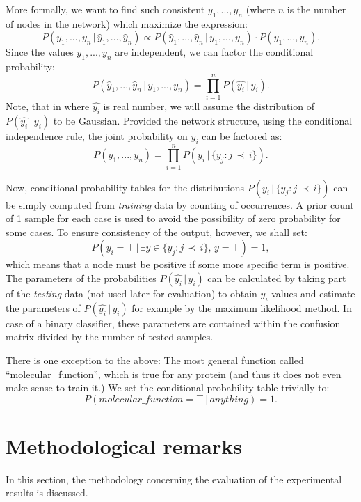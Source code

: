 \documentclass[11pt,twoside,a4paper]{book}
\begin{document}
More formally, we want to find such consistent $y_1, ..., y_n$
(where $n$ is the number of nodes in the network)
which maximize the expression:
\[P(y_1, ..., y_n \,|\, \hat{y}_1, ..., \hat{y}_n) \propto P(\hat{y}_1, ..., \hat{y}_n\, | \, y_1, ..., y_n) \cdot P(y_1, ..., y_n). \]
Since the values $y_1, ..., y_n$ are independent, we can factor the conditional probability:
\[P(\hat{y}_1, ..., \hat{y}_n\, |\, y_1, ..., y_n) = \prod_{i=1}^n P(\hat{y_i} \,|\,y_i). \]
Note, that in where $\hat{y_i}$ is real number,
we will assume the distribution of $P(\hat{y_i}\,|\,y_i)$ to be Gaussian.
Provided the network structure, using the conditional independence rule,
the joint probability on $y_i$ can be factored as:
\[ P(y_1, ..., y_n) = \prod_{i=1}^n P(y_i\,|\,\{y_j : j  \,  \prec \,  i\}). \]

Now, conditional probability tables for the distributions $P(y_i\,|\,\{y_j : j  \,  \prec \,  i\})$ 
can be simply computed from \emph{training} data by counting of occurrences.
A prior count of 1 sample for each case is used to avoid the 
possibility of zero probability for some cases.
To ensure consistency of the output, however, 
we shall set:
\[ P(y_i = \top \, | \, \exists y \in \{y_j : j  \,  \prec \,  i\}, \, y = \top  ) = 1, \]
which means that a node must be positive if some more specific term is positive.
The parameters of the probabilities $P(\hat{y_i}\,|\,y_i)$ can be
calculated by taking part of the \emph{testing} data
(not used later for evaluation) to
obtain $y_i$ values and estimate the parameters of $P(\hat{y_i}\,|\,y_i)$
for example by the maximum likelihood method.
In case of a binary classifier, 
these parameters are contained within the confusion matrix divided 
by the number of tested samples.

There is one exception to the above: 
The most general function called ``molecular\_function'',
which is true for any protein
(and thus it does not even make sense to train it.)
We set the conditional probability table trivially to:
\[ P(molecular\_function = \top \,|\, anything ) = 1. \]

\section{Methodological remarks}
In this section, the methodology concerning the evaluation
of the experimental results is discussed.
\end{document}
